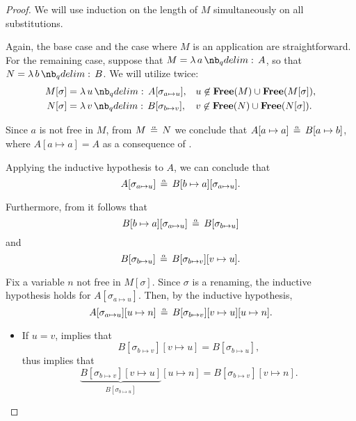 \begin{proof}
  We will use induction on the length of \( M \) simultaneously on all substitutions.

  Again, the base case and the case where \( M \) is an application are straightforward. For the remaining case, suppose that \( M = \qabs a A \), so that \( N = \qabs b B \). We will utilize  twice:
  \begin{align*}
    M[\sigma] &= \qabs u A[\sigma_{a \mapsto u}], &&u \not\in \op*{Free}(M) \cup \op*{Free}(M[\sigma]), \\
    N[\sigma] &= \qabs v B[\sigma_{b \mapsto v}], &&v \not\in \op*{Free}(N) \cup \op*{Free}(N[\sigma]).
  \end{align*}

  Since \( a \) is not free in \( M \), from \( M \aequiv N \) we conclude that \( A[a \mapsto a] \aequiv B[a \mapsto b] \), where \( A[a \mapsto a] = A \) as a consequence of .

  Applying the inductive hypothesis to \( A \), we can conclude that
  \begin{equation*}
    A[\sigma_{a \mapsto u}] \aequiv B[b \mapsto a][\sigma_{a \mapsto u}].
  \end{equation*}

  Furthermore, from  it follows that
  \begin{equation*}
    B[b \mapsto a][\sigma_{a \mapsto u}] \aequiv B[\sigma_{b \mapsto u}]
  \end{equation*}
  and
  \begin{equation*}
    B[\sigma_{b \mapsto u}] \aequiv B[\sigma_{b \mapsto v}][v \mapsto u].
  \end{equation*}

  Fix a variable \( n \) not free in \( M[\sigma] \). Since \( \sigma \) is a renaming, the inductive hypothesis holds for \( A[\sigma_{a \mapsto u}] \). Then, by the inductive hypothesis,
  \begin{equation*}
    A[\sigma_{a \mapsto u}][u \mapsto n]
    \aequiv
    B[\sigma_{b \mapsto v}][v \mapsto u][u \mapsto n].
  \end{equation*}

  \begin{itemize}
    \item If \( u = v \),  implies that
    \begin{equation*}
      B[\sigma_{b \mapsto v}][v \mapsto u] = B[\sigma_{b \mapsto u}],
    \end{equation*}
    thus  implies that
    \begin{equation*}
      \underbrace{B[\sigma_{b \mapsto v}][v \mapsto u]}_{B[\sigma_{b \mapsto u}]}[u \mapsto n] = B[\sigma_{b \mapsto v}][v \mapsto n].
    \end{equation*}


\end{itemize}
\end{proof}
